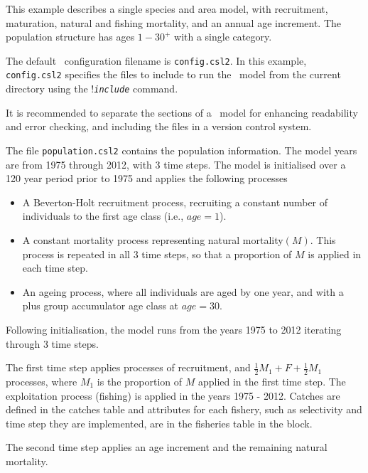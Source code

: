 This example describes a single species and area model, with recruitment, maturation, natural and fishing mortality, and an annual age increment. The population structure has ages $1-30^{+}$ with a single category.

The default \CNAME\ configuration filename is \texttt{config.csl2}. In this example, \texttt{config.csl2} specifies the files to include to run the \CNAME\ model from the current directory using the !\texttt{\emph{include}} command.

 

It is recommended to separate the sections of a \CNAME\ model for enhancing readability and error checking, and including the files in a version control system.

The file  \texttt{population.csl2} contains the population information. The model years are from 1975 through 2012, with 3 time steps. The model is initialised over a 120 year period prior to 1975 and applies the following processes

\begin{itemize}
\item A Beverton-Holt recruitment process, recruiting a constant number of individuals to the first age class (i.e., $age=1$).

\item A constant mortality process representing natural mortality$(M)$. This process is repeated in all 3 time steps, so that a proportion of $M$ is applied in each time step.

\item An ageing process, where all individuals are aged by one year, and with a plus group accumulator age class at $age=30$.
\end{itemize}

Following initialisation, the model runs from the years 1975 to 2012 iterating through 3 time steps.

The first time step applies processes of recruitment, and  $\frac{1}{2} M_1 + F + \frac{1}{2} M_1$ processes, where $M_1$ is the proportion of $M$ applied in the first time step. The exploitation process (fishing) is applied in the years 1975 - 2012. Catches are defined in the catches table and attributes for each fishery, such as selectivity and time step they are implemented, are in the fisheries table in the  block.

The second time step applies an age increment and the remaining natural mortality.

